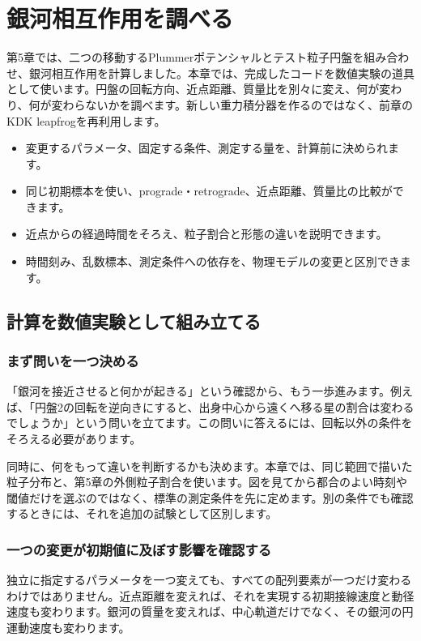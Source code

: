 \chapter{銀河相互作用を調べる}
\label{chap:experiments}
第5章では、二つの移動するPlummerポテンシャルとテスト粒子円盤を組み合わせ、銀河相互作用を計算しました。本章では、完成したコードを数値実験の道具として使います。円盤の回転方向、近点距離、質量比を別々に変え、何が変わり、何が変わらないかを調べます。新しい重力積分器を作るのではなく、前章のKDK leapfrogを再利用します。

\begin{goalbox}[この章で学ぶこと]
\begin{itemize}
\item 変更するパラメータ、固定する条件、測定する量を、計算前に決められます。
\item 同じ初期標本を使い、prograde・retrograde、近点距離、質量比の比較ができます。
\item 近点からの経過時間をそろえ、粒子割合と形態の違いを説明できます。
\item 時間刻み、乱数標本、測定条件への依存を、物理モデルの変更と区別できます。
\end{itemize}
\end{goalbox}

\section{計算を数値実験として組み立てる}
\label{sec:ch6-design}
\subsection{まず問いを一つ決める}
「銀河を接近させると何かが起きる」という確認から、もう一歩進みます。例えば、「円盤2の回転を逆向きにすると、出身中心から遠くへ移る星の割合は変わるでしょうか」という問いを立てます。この問いに答えるには、回転以外の条件をそろえる必要があります。

同時に、何をもって違いを判断するかも決めます。本章では、同じ範囲で描いた粒子分布と、第5章の外側粒子割合を使います。図を見てから都合のよい時刻や閾値だけを選ぶのではなく、標準の測定条件を先に定めます。別の条件でも確認するときには、それを追加の試験として区別します。

\subsection{一つの変更が初期値に及ぼす影響を確認する}
独立に指定するパラメータを一つ変えても、すべての配列要素が一つだけ変わるわけではありません。近点距離を変えれば、それを実現する初期接線速度と動径速度も変わります。銀河の質量を変えれば、中心軌道だけでなく、その銀河の円運動速度も変わります。

